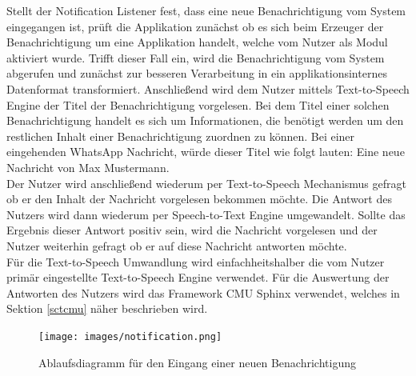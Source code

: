 Stellt der Notification Listener fest, dass eine neue Benachrichtigung vom System eingegangen ist, prüft die Applikation zunächst ob es sich beim Erzeuger der Benachrichtigung um eine Applikation handelt, welche vom Nutzer als Modul aktiviert wurde. Trifft dieser Fall ein, wird die Benachrichtigung vom System abgerufen und zunächst zur besseren Verarbeitung in ein applikationsinternes Datenformat transformiert. Anschließend wird dem Nutzer mittels Text-to-Speech Engine der Titel der Benachrichtigung vorgelesen. Bei dem Titel einer solchen Benachrichtigung handelt es sich um Informationen, die benötigt werden um den restlichen Inhalt einer Benachrichtigung zuordnen zu können. Bei einer eingehenden WhatsApp Nachricht, würde dieser Titel wie folgt lauten: Eine neue Nachricht von Max Mustermann.\\
Der Nutzer wird anschließend wiederum per Text-to-Speech Mechanismus gefragt ob er den Inhalt der Nachricht vorgelesen bekommen möchte. Die Antwort des Nutzers wird dann wiederum per Speech-to-Text Engine umgewandelt. Sollte das Ergebnis dieser Antwort positiv sein, wird die Nachricht vorgelesen und der Nutzer weiterhin gefragt ob er auf diese Nachricht antworten möchte.\\
Für die Text-to-Speech Umwandlung wird einfachheitshalber die vom Nutzer primär eingestellte Text-to-Speech Engine verwendet. Für die Auswertung der Antworten des Nutzers wird das Framework CMU Sphinx verwendet, welches in Sektion \ref{sctcmu} näher beschrieben wird.

\begin{figure}[h]
	\centering
  \texttt{[image: images/notification.png]}
	\caption{Ablaufsdiagramm für den Eingang einer neuen Benachrichtigung}
	\label{figNotification}
\end{figure}

